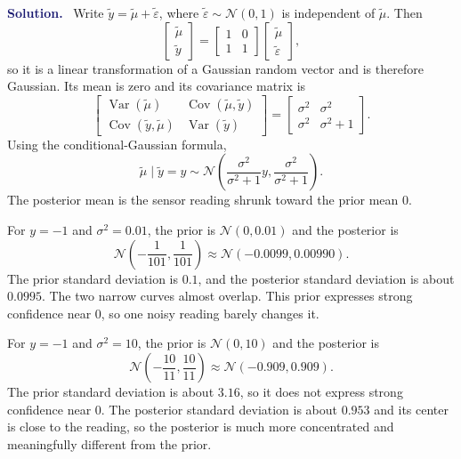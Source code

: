 \documentclass[11pt]{article}
\newcommand{\Cov}{\operatorname{Cov}}
\newcommand{\Var}{\operatorname{Var}}
\newcommand{\rv}[1]{\widetilde{#1}}
\newenvironment{answer}{%
    \par\medskip\noindent\textcolor{MidnightBlue}{\textbf{Solution.}}\ }
    {\par\medskip}
\begin{document}
\begin{answer}
Write $\rv{y}=\rv{\mu}+\rv{\varepsilon}$, where
$\rv{\varepsilon}\sim\mathcal N(0,1)$ is independent of $\rv{\mu}$.  Then
\[
  \begin{bmatrix}\rv{\mu}\\\rv{y}\end{bmatrix}
  =\begin{bmatrix}1&0\\1&1\end{bmatrix}
   \begin{bmatrix}\rv{\mu}\\\rv{\varepsilon}\end{bmatrix},
\]
so it is a linear transformation of a Gaussian random vector and is therefore
Gaussian.  Its mean is zero and its covariance matrix is
\[
  \begin{bmatrix}
    \Var(\rv{\mu}) & \Cov(\rv{\mu},\rv{y})\\
    \Cov(\rv{y},\rv{\mu}) & \Var(\rv{y})
  \end{bmatrix}
  =\boxed{\begin{bmatrix}
    \sigma^2 & \sigma^2\\
    \sigma^2 & \sigma^2+1
  \end{bmatrix}}.
\]
Using the conditional-Gaussian formula,
\[
  \boxed{
  \rv{\mu}\mid\rv{y}=y
  \sim\mathcal N\!\left(
    \frac{\sigma^2}{\sigma^2+1}y,
    \frac{\sigma^2}{\sigma^2+1}\right).}
\]
The posterior mean is the sensor reading shrunk toward the prior mean $0$.

For $y=-1$ and $\sigma^2=0.01$, the prior is
$\mathcal N(0,0.01)$ and the posterior is
\[
  \mathcal N\!\left(-\frac1{101},\frac1{101}\right)
  \approx\mathcal N(-0.0099,0.00990).
\]
The prior standard deviation is $0.1$, and the posterior standard deviation is
about $0.0995$.  The two narrow curves almost overlap.  This prior expresses
strong confidence near $0$, so one noisy reading barely changes it.

For $y=-1$ and $\sigma^2=10$, the prior is $\mathcal N(0,10)$ and the posterior
is
\[
  \mathcal N\!\left(-\frac{10}{11},\frac{10}{11}\right)
  \approx\mathcal N(-0.909,0.909).
\]
The prior standard deviation is about $3.16$, so it does not express strong
confidence near $0$.  The posterior standard deviation is about $0.953$ and
its center is close to the reading, so the posterior is much more concentrated
and meaningfully different from the prior.
\end{answer}

\newpage
\end{document}
